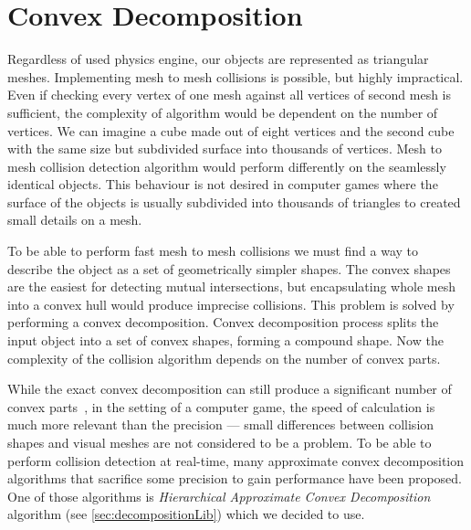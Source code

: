 \section{Convex Decomposition}
\label{sec:decomposition}
Regardless of used physics engine, our objects are represented as triangular meshes. Implementing mesh to mesh collisions is possible, but highly impractical. Even if checking every vertex of one mesh against all vertices of second mesh is sufficient, the complexity of algorithm would be dependent on the number of vertices. We can imagine a cube made out of eight vertices and the second cube with the same size but subdivided surface into thousands of vertices. Mesh to mesh collision detection algorithm would perform differently on the seamlessly identical objects. This behaviour is not desired in computer games where the surface of the objects is usually subdivided into thousands of triangles to created small details on a mesh.

To be able to perform fast  mesh to mesh collisions we must find a way to describe the object as a set of geometrically simpler shapes. The convex shapes are the easiest for detecting mutual intersections, but encapsulating whole mesh into a convex hull would produce imprecise collisions. This problem is solved by performing a convex decomposition. Convex decomposition process splits the input object into a set of convex shapes, forming a compound shape. Now the complexity of the collision algorithm depends on the number of convex parts. 

While the exact convex decomposition can still produce a significant number of convex parts~\cite{convexDecomp}, in the setting of a computer game, the speed of calculation is much more relevant than the precision --- small differences between collision shapes and visual meshes are not considered to be a problem. To be able to perform collision detection at real-time, many approximate convex decomposition algorithms that sacrifice some precision to gain performance have been proposed. One of those algorithms is \emph{Hierarchical Approximate Convex Decomposition} algorithm (see \cref{sec:decompositionLib}) which we decided to use.

